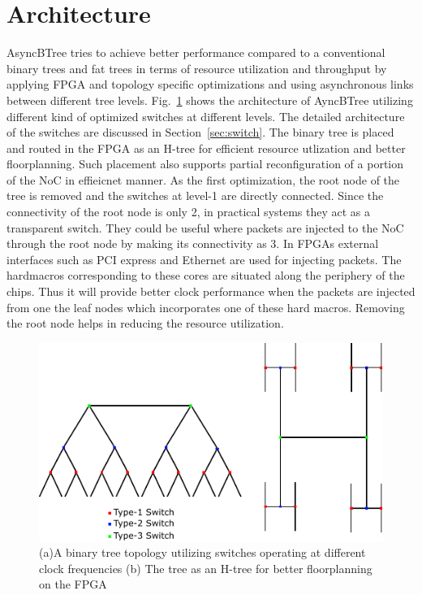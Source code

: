 \section{Architecture}
\label{sec:arch}

AsyncBTree tries to achieve better performance compared to a conventional binary trees and fat trees in terms of resource utilization and throughput by applying FPGA and topology specific optimizations and using asynchronous links between different tree levels.
Fig.~\ref{fig:btree} shows the architecture of AyncBTree utilizing different kind of optimized switches at different levels.
The detailed architecture of the switches are discussed in Section~\ref{sec:switch}.
The binary tree is placed and routed in the FPGA as an H-tree for efficient resource utlization and better floorplanning.
Such placement also supports partial reconfiguration of a portion of the NoC in effieicnet manner.
As the first optimization, the root node of the tree is removed and the switches at level-1 are directly connected.
Since the connectivity of the root node is only 2, in practical systems they act as a transparent switch.
They could be useful where packets are injected to the NoC through the root node by making its connectivity as 3.
In FPGAs external interfaces such as PCI express and Ethernet are used for injecting packets.
The hardmacros corresponding to these cores are situated along the periphery of the chips.
Thus it will provide better clock performance when the packets are injected from one the leaf nodes which incorporates one of these hard macros.
Removing the root node helps in reducing the resource utilization.

\begin{figure}[t]
\centering
   \includegraphics[width=\columnwidth]{Figures/HNoC.pdf}
   \caption{(a)A binary tree topology utilizing switches operating at different clock frequencies (b) The tree as an H-tree for better floorplanning on the FPGA}
   \label{fig:btree}
\end{figure}


